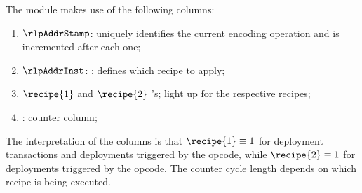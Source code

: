 The \rlp{} module makes use of the following columns:
\begin{enumerate}
	\item $\rlpAddrStamp$: uniquely identifies the current encoding operation and is incremented after each one;
	\item $\rlpAddrInst$:
		\godGiven{}
		\ccc{}; defines which recipe to apply;
	\item $\recipe{1}$ and $\recipe{2}$
		\ccbc{}'s; light up for the respective recipes;
	\item \ct: counter column; 
\end{enumerate}
The interpretation of the  columns is that
$\recipe{1} \equiv 1$ for deployment transactions and deployments triggered by the  opcode, while
$\recipe{2} \equiv 1$ for deployments triggered by the  opcode.
The counter cycle length depends on which recipe is being executed.

